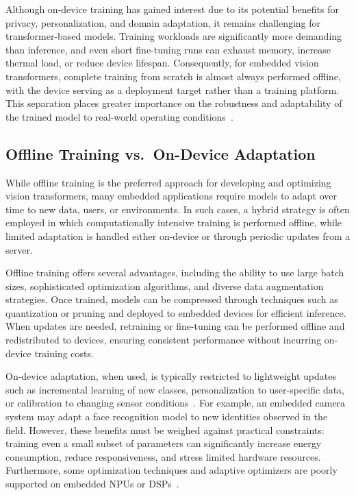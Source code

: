 \documentclass[runningheads,a4paper]{llncs}
\begin{document}
Although on-device training has gained interest due to its potential benefits for privacy, personalization, and domain adaptation, it remains challenging for transformer-based models. Training workloads are significantly more demanding than inference, and even short fine-tuning runs can exhaust memory, increase thermal load, or reduce device lifespan. Consequently, for embedded vision transformers, complete training from scratch is almost always performed offline, with the device serving as a deployment target rather than a training platform. This separation places greater importance on the robustness and adaptability of the trained model to real-world operating conditions~\cite{zhu2024ondevice_training_survey,mlsys2023ondevice_chapter}.

\subsection{Offline Training vs.\ On-Device Adaptation}
While offline training is the preferred approach for developing and optimizing vision transformers, many embedded applications require models to adapt over time to new data, users, or environments. In such cases, a hybrid strategy is often employed in which computationally intensive training is performed offline, while limited adaptation is handled either on-device or through periodic updates from a server.

Offline training offers several advantages, including the ability to use large batch sizes, sophisticated optimization algorithms, and diverse data augmentation strategies. Once trained, models can be compressed through techniques such as quantization or pruning and deployed to embedded devices for efficient inference. When updates are needed, retraining or fine-tuning can be performed offline and redistributed to devices, ensuring consistent performance without incurring on-device training costs.

On-device adaptation, when used, is typically restricted to lightweight updates such as incremental learning of new classes, personalization to user-specific data, or calibration to changing sensor conditions~\cite{nadalini2025odl_tiny,mlsys2023ondevice_chapter}. For example, an embedded camera system may adapt a face recognition model to new identities observed in the field. However, these benefits must be weighed against practical constraints: training even a small subset of parameters can significantly increase energy consumption, reduce responsiveness, and stress limited hardware resources. Furthermore, some optimization techniques and adaptive optimizers are poorly supported on embedded NPUs or DSPs~\cite{mlsys2023ondevice_chapter}.
\end{document}
